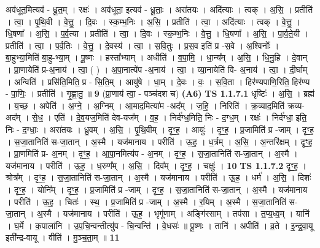\documentclass[17pt]{extarticle}
\begin{document}
                  अव॑धूत॒मित्यव॑ - धू॒त॒म् । रक्षः॑ । अव॑धूता॒ इत्यव॑ - धू॒ताः॒ । अरा॑तयः । अदि॑त्याः । त्वक् । अ॒सि॒ । प्रतीति॑ । त्वा॒ । पृ॒थि॒वी । वे॒त्तु॒ । दि॒वः । स्क॒म्भ॒निः । अ॒सि॒ । प्रतीति॑ । त्वा॒ । अदि॑त्याः । त्वक् । वे॒त्तु॒ । धि॒षणा᳚ । अ॒सि॒ । प॒र्व॒त्या । प्रतीति॑ । त्वा॒ । दि॒वः । स्क॒म्भ॒निः । वे॒त्तु॒ । धि॒षणा᳚ । अ॒सि॒ । पा॒र्व॒ते॒यी । प्रतीति॑ । त्वा॒ । प॒र्व॒तिः । वे॒त्तु॒ । दे॒वस्य॑ । त्वा॒ । स॒वि॒तुः । प्र॒स॒व इति॑ प्र -स॒वे । अ॒श्विनोः᳚ । बा॒हुभ्या॒मिति॑ बा॒हु-भ्या॒म् । पू॒ष्णः । हस्ता᳚भ्याम् । अधीति॑ । व॒पा॒मि॒ । धा॒न्य᳚म् । अ॒सि॒ । धि॒नु॒हि । दे॒वान् । प्रा॒णायेति॑ प्र-अ॒नाय॑ । त्वा॒ ( ) । अ॒पा॒नात्ये॑प -अ॒नाय॑ । त्वा॒ । व्या॒नायेति॑ वि- अ॒नाय॑ । त्वा॒ । दी॒र्घाम् । अन्विति॑ । प्रसि॑ति॒मिति॒ प्र - सि॒ति॒म् । आयु॑षे । धा॒म् । दे॒वः । वः॒ । स॒वि॒ता । हिर॑ण्यपाणि॒रिति॒ हिर॑ण्य - पा॒णिः॒ । प्रतीति॑ । गृ॒ह्णा॒तु॒ ॥ \textbf{  9 } \newline
                  \newline
                      (प्रा॒णाय॑ त्वा॒ - पञ्च॑दश च)  \textbf{(A6)} \newline \newline
                                \textbf{ TS 1.1.7.1} \newline
                  धृष्टिः॑ । अ॒सि॒ । ब्रह्म॑ । य॒च्छ॒ । अपेति॑ । अ॒ग्ने॒ । अ॒ग्निम् । आ॒माद॒मित्या॑म -अद᳚म् । ज॒हि॒ । निरिति॑ । क्र॒व्याद॒मिति॑ क्रव्य- अद᳚म् । से॒ध॒ । एति॑ । दे॒व॒यज॒मिति॑ देव-यज᳚म् । व॒ह॒ । निर्द॑ग्ध॒मिति॒ निः - द॒ग्ध॒म् । रक्षः॑ । निर्द॑ग्धा॒ इति॒ निः - द॒ग्धाः॒ । अरा॑तयः । ध्रु॒वम् । अ॒सि॒ । पृ॒थि॒वीम् । दृꣳ॒॒ह॒ । आयुः॑ । दृꣳ॒॒ह॒ । प्र॒जामिति॑ प्र -जाम् । दृꣳ॒॒ह॒ । स॒जा॒तानिति॑ स-जा॒तान् । अ॒स्मै । यज॑मानाय । परीति॑ । ऊ॒ह॒ । ध॒र्त्रम् । अ॒सि॒ । अ॒न्तरि॑क्षम् । दृꣳ॒॒ह॒ । प्रा॒णमिति॑ प्र- अ॒नम् । दृꣳ॒॒ह॒ । आ॒पा॒नमित्य॑प - अ॒नम् । दृꣳ॒॒ह॒ । स॒जा॒तानिति॑ स-जा॒तान् । अ॒स्मै । यज॑मानाय । परीति॑ । ऊ॒ह॒ । ध॒रुण᳚म् । अ॒सि॒ । दिव᳚म् । दृꣳ॒॒ह॒ । चक्षुः॑ । \textbf{  10 } \newline
                  \newline
                                \textbf{ TS 1.1.7.2} \newline
                  दृꣳ॒॒ह॒ । श्रोत्र᳚म् । दृꣳ॒॒ह॒ । स॒जा॒तानिति॑ स-जा॒तान् । अ॒स्मै । यज॑मानाय । परीति॑ । ऊ॒ह॒ । धर्म॑ । अ॒सि॒ । दिशः॑ । दृꣳ॒॒ह॒ । योनि᳚म् । दृꣳ॒॒ह॒ । प्र॒जामिति॑ प्र -जाम् । दृꣳ॒॒ह॒ । स॒जा॒तानिति॑ स-जा॒तान् । अ॒स्मै । यज॑मानाय । परीति॑ । ऊ॒ह॒ । चितः॑ । स्थ॒ । प्र॒जामिति॑ प्र -जाम् । अ॒स्मै । र॒यिम् । अ॒स्मै । स॒जा॒तानिति॑ स-जा॒तान् । अ॒स्मै । यज॑मानाय । परीति॑ । ऊ॒ह॒ । भृगू॑णाम् । अङ्गि॑रसाम् । तप॑सा । त॒प्य॒ध्व॒म् । यानि॑ । घ॒र्मे । क॒पाला॑नि । उ॒प॒चि॒न्वन्तीत्यु॑प - चि॒न्वन्ति॑ । वे॒धसः॑ ॥ पू॒ष्णः । तानि॑ । अपीति॑ । व्र॒ते । इ॒न्द्र॒वा॒यू इती᳚न्द्र-वायू । वीति॑ । मु॒ञ्च॒ता॒म् ॥ \textbf{  11} \newline
\end{document}
